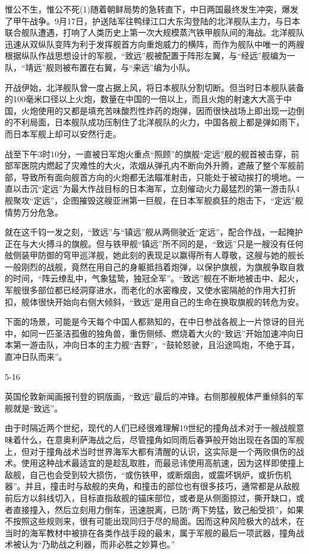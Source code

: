 \documentclass[12pt,UTF8]{ctexbook}
\begin{document}
惟公不生，惟公不死(1)随着朝鲜局势的急转直下，中日两国最终发生冲突，爆发了甲午战争。9月17日，护送陆军往鸭绿江口大东沟登陆的北洋舰队主力，与日本联合舰队遭遇，打响了人类历史上第一次大规模蒸汽铁甲舰队间的海战。北洋舰队迅速从双纵队变阵为利于发挥舰首方向重炮威力的横阵，而作为舰队中唯一的两艘根据纵队作战思想设计的军舰，“致远”舰被配置于阵形左翼，与“经远”舰编为一队，“靖远”舰则被布置在右翼，与“来远”编为小队。

开战伊始，北洋舰队曾一度占据上风，将日本舰队分割切断。但当时日本舰队装备的100毫米口径以上火炮，数量在中国的一倍以上，而且火炮的射速大大高于中国，火炮使用的又都是填充苦味酸烈性炸药的炮弹，因而很快战场上即出现一边倒的不利局面，日本舰队成功压制住了北洋舰队的火力，中国各舰上都是弹如雨下，而日本军舰上却可以安然行走。

战至下午3时10分，一直被日军炮火重点“照顾”的旗舰“定远”舰的舰首被击穿，前部军医院内燃起了灾难性的大火，浓烟从弹孔内不断向外升腾，遮蔽了整个军舰前部，导致所有面向舰首方向的火炮都无法瞄准射击，只能处于被动挨打的境地。一直以击沉“定远”为最大作战目标的日本海军，立刻催动火力最猛烈的第一游击队4舰聚攻“定远”，企图摧毁这艘亚洲第一巨舰，在日本军舰疯狂的炮击下，“定远”舰情势万分危急。

就在这千钧一发之刻，“致远”与“镇远”舰从两侧驶近“定远”，配合作战，一起掩护正在与大火搏斗的旗舰。但与铁甲舰“镇远”所不同的是，“致远”只是一艘没有任何舷侧装甲防御的穹甲巡洋舰，她此刻的表现足以赢得所有人尊敬，这艘与她的舰长一般刚烈的战舰，竟然在用自己的身躯抵挡着炮弹，以保护旗舰，为旗舰争取自救的时间，“阵云缭乱中，气象猛鸷，独冠全军”。“致远”舰在不断地被击中、起火，军舰很多部位都已经洞穿进水，而老化的水密橡皮，又使水密隔舱的作用大打折扣，舰体很快开始向右侧大倾斜，“致远”是用自己的生命在换取旗舰的转危为安。

下面的场景，可能是今天每个中国人都熟知的，在中日参战各舰上一片惊讶的目光中，如同一匹圣洁孤傲的独角兽，重伤侧倾、燃烧着大火的“致远”开始加速冲向日本第一游击队，冲向日本的主力舰“吉野”，“鼓轮怒驶，且沿途鸣炮，不绝于耳，直冲日队而来”。

5-16

英国伦敦新闻画报刊登的铜版画，“致远”最后的冲锋。右侧那艘舰体严重倾斜的军舰就是“致远”。

由于时隔近两个世纪，现代的人们已经很难理解19世纪的撞角战术对于一艘战舰意味着什么，在意奥利萨海战之后，尽管撞角如同雨后春笋般开始出现在各国的军舰上，但对于撞角战术当时世界海军大都有清醒的认识，这实际是一个两败俱伤的战术。使用这种战术最适宜的是趁乱取胜，而最忌讳使用高航速，因为这样即使撞上敌舰，自己也会受到较大损伤，“或伤铁甲，或断烟囱，或震坏锅炉，或折伤机器”。并且，撞击时与敌舰的夹角，和撞击的部位也有很多技巧，通常都是从敌舰前后方以斜线切入，目标直指敌舰的锚床部位，或者是从侧面掠过，撕开缺口，或者直接撞入，然后立刻用力倒车，迅速脱离，已防“两下势猛，致己船受损”，如果不按照这些规则来，很有可能出现同归于尽的局面。因而这种风险极大的战术，在当时的海军教材中被排在各类作战手段的最末，属于军舰的最后一项武器，撞角战术被认为“乃助战之利器，而非必胜之妙算也。”
\end{document}
